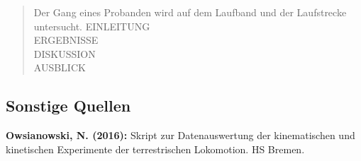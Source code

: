 \documentclass[11pt,captions=tableheading]{scrartcl}
\begin{document}

\setcounter{page}{1}
\tableofcontents
\setcounter{tocdepth}{3}
\clearscrheadfoot
\pagestyle{scrheadings}
\cfoot[]{} 
\ofoot[\pagemark]{\pagemark}
\newpage
{}
\setcounter{page}{1}

\begin{abstract}
	Der Gang eines Probanden wird auf dem Laufband und der Laufstrecke untersucht. 
	EINLEITUNG\\
	ERGEBNISSE\\
	DISKUSSION\\
	AUSBLICK\\
\end{abstract}








\begin{spacing}{1}
\pagestyle{scrheadings}
\printbibliography
\section{Sonstige Quellen}
\textbf{Owsianowski, N. (2016):} Skript zur Datenauswertung der kinematischen und kinetischen Experimente der terrestrischen Lokomotion. HS Bremen.
\end{spacing}



\end{document}
